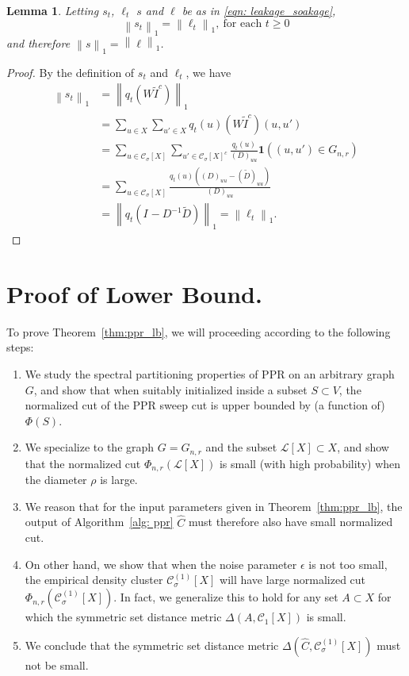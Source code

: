 \documentclass[11pt,twoside]{article}
\newtheorem{lemma}{Lemma}
\newcommand{\norm}[1]{\left\lVert#1\right\rVert}
\newcommand{\1}{\mathbf{1}}
\newcommand{\Xbf}{X}             %
\newcommand{\Wbf}{W}
\newcommand{\Dbf}{D}
\newcommand{\Ibf}[1]{I_{#1}}
\newcommand{\Cset}{\mathcal{C}}
\newcommand{\Csig}{\Cset_{\sigma}}
\begin{document}
\begin{lemma}
	\label{lem: total_leakage_equal_total_soakage}
	Letting $s_t$, $\ell_t$ $s$ and $\ell$ be as in \eqref{eqn: leakage_soakage},
	\begin{equation*}
	\norm{s_t}_1 = \norm{\ell_t}_1,~ \textrm{for each $t \geq 0$}
	\end{equation*}
	and therefore $\norm{s}_1 = \norm{\ell}_1$. 
\end{lemma}
\begin{proof}
	By the definition of $s_t$ and $\ell_t$, we have
	\begin{align*}
	\norm{s_t}_1 & = \norm{q_t (\Wbf \widetilde{I}^c)}_1 \\
	& = \sum_{u \in \Xbf} \sum_{u' \in \Xbf} q_t(u) (\Wbf \widetilde{I}^c)(u, u') \\
	& = \sum_{u \in\Csig[\Xbf]} \sum_{u' \in \Csig[\Xbf]^c} \frac{q_t(u)}{(\Dbf)_{uu}} \1((u,u') \in G_{n,r}) \\
	& = \sum_{u \in \Csig[\Xbf]} \frac{q_t(u) \left((\Dbf)_{uu} - (\widetilde{\Dbf})_{uu} \right)}{(\Dbf)_{uu}} \\
	& = \norm{q_t (\Ibf{} - \Dbf^{-1} \widetilde{\Dbf})}_1 = \norm{\ell_t}_1.
	\end{align*}
\end{proof}

\section{Proof of Lower Bound.}

To prove Theorem~\ref{thm:ppr_lb}, we will proceeding according to the following steps:
\begin{enumerate}
	\item We study the spectral partitioning properties of PPR on an arbitrary graph $G$, and show that when suitably initialized inside a subset $S \subset V$, the normalized cut of the PPR sweep cut is upper bounded by (a function of) $\Phi(S)$. 
	\item We specialize to the graph $G = G_{n,r}$ and the subset $\mathcal{L}[\Xbf] \subset \Xbf$, and show that the normalized cut $\Phi_{n,r}(\mathcal{L}[\Xbf])$ is small (with high probability) when the diameter $\rho$ is large.
	\item We reason that for the input parameters given in Theorem~\ref{thm:ppr_lb}, the output of Algorithm~\ref{alg: ppr} $\widehat{C}$ must therefore also have small normalized cut.
	\item On other hand, we show that when the noise parameter $\epsilon$ is not too small, the empirical density cluster $\Csig^{(1)}[\Xbf]$ will have large normalized cut $\Phi_{n,r}(\Csig^{(1)}[\Xbf])$. In fact, we generalize this to hold for any set $A \subset \Xbf$ for which the symmetric set distance metric $\Delta(A,\Cset_1[\Xbf])$ is small.
	\item We conclude that the symmetric set distance metric $\Delta(\widehat{C},\Csig^{(1)}[\Xbf])$ must not be small.
\end{enumerate}
\end{document}
